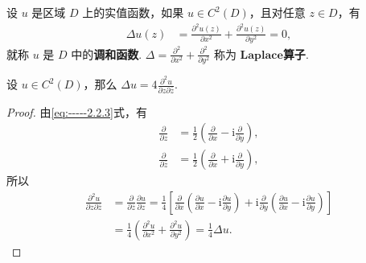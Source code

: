 \documentclass[../../main.tex]{subfiles}%
\begin{document}
\begin{definition}[调和函数]
设 $u$ 是区域 $D$ 上的实值函数，如果 $u \in C^2(D)$，且对任意 $z \in D$，有
\begin{align}
\Delta u(z) &= \frac{\partial^2 u(z)}{\partial x^2} + \frac{\partial^2 u(z)}{\partial y^2} = 0, \label{eq:2.2.7}
\end{align}
就称 $u$ 是 $D$ 中的\textbf{调和函数}. $\Delta = \frac{\partial^2}{\partial x^2} + \frac{\partial^2}{\partial y^2}$ 称为 $\mathbf{Laplace}$\textbf{算子}.
\end{definition}

\begin{proposition}
设 $u \in C^2(D)$，那么 $\Delta u = 4 \frac{\partial^2 u}{\partial z \partial \overline{z}}$.
\end{proposition}
\begin{proof}

由\eqref{eq:-----2.2.3}式，有
\begin{align*}
\frac{\partial}{\partial z} &= \frac{1}{2}\left( \frac{\partial}{\partial x} - \text{i}\frac{\partial}{\partial y} \right), \\
\frac{\partial}{\partial \overline{z}} &= \frac{1}{2}\left( \frac{\partial}{\partial x} + \text{i}\frac{\partial}{\partial y} \right),
\end{align*}
所以
\begin{align*}
\frac{\partial^2 u}{\partial z \partial \overline{z}} &= \frac{\partial}{\partial \overline{z}} \frac{\partial u}{\partial z} = \frac{1}{4} \left[ \frac{\partial}{\partial x} \left( \frac{\partial u}{\partial x} - \mathrm{i} \frac{\partial u}{\partial y} \right) + \mathrm{i} \frac{\partial}{\partial y} \left( \frac{\partial u}{\partial x} - \mathrm{i} \frac{\partial u}{\partial y} \right) \right] \\
&= \frac{1}{4} \left( \frac{\partial^2 u}{\partial x^2} + \frac{\partial^2 u}{\partial y^2} \right) = \frac{1}{4} \Delta u.
\end{align*}

\end{proof}
\end{document}
